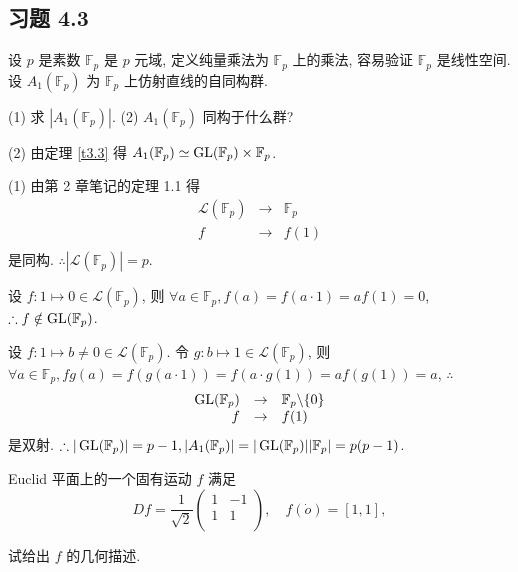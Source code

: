 \documentclass{ctexart}
\begin{document}
\subsection{习题 4.3}
    
\begin{exercise}%
    设 $p$ 是素数 $\mathbb{F}_p$ 是 $p$ 元域, 定义纯量乘法为 $\mathbb{F}_p$ 上的乘法, 容易验证 $\mathbb{F}_p$ 是线性空间. 设 $A_1(\mathbb{F}_p)$ 为 $\mathbb{F}_p$ 上仿射直线的自同构群.

    (1) 求 $|A_1(\mathbb{F}_p)|$. (2) $A_1(\mathbb{F}_p)$ 同构于什么群?
\end{exercise}
\begin{solution}
    (2) 由定理 \ref{t3.3} 得 $A_1(\mathbb{F}_p)\simeq\operatorname{GL} (\mathbb{F}_p)\times\mathbb{F}_p$.

    (1) 由第 2 章笔记的定理 1.1 得
    \[\begin{array}{rcl}
        \mathcal{L}(\mathbb{F}_p) & \to & \mathbb{F}_p \\
        f & \to & f(1) \\
    \end{array}\]
    是同构. $\therefore|\mathcal{L}(\mathbb{F}_p)|=p$.

    设 $f:1\mapsto0\in\mathcal{L}(\mathbb{F}_p)$, 则 $\forall a\in\mathbb{F}_p,f(a)=f(a\cdot 1)=af(1)=0$, $\therefore f\notin\operatorname{GL} (\mathbb{F}_p)$.

    设 $f:1\mapsto b\neq0\in\mathcal{L}(\mathbb{F}_p)$. 令 $g:b\mapsto 1\in\mathcal{L}(\mathbb{F}_p)$, 则 $\forall a\in\mathbb{F}_p,fg(a)=f(g(a\cdot 1))=f(a\cdot g(1))=af(g(1))=a$, $\therefore$
    \[\begin{array}{rcl}
        \operatorname{GL} (\mathbb{F}_p) & \to & \mathbb{F}_p\backslash\{0\} \\
        f & \to & f(1) \\
    \end{array}\]
    是双射. $\therefore|\operatorname{GL} (\mathbb{F}_p)|=p-1,|A_1(\mathbb{F}_p)|=|\operatorname{GL} (\mathbb{F}_p)||\mathbb{F}_p|=p(p-1)$.
\end{solution}
\begin{exercise}%
    Euclid 平面上的一个固有运动 $f$ 满足
    \[Df=\dfrac{1}{\sqrt{2}}\begin{pmatrix}
        1 & -1 \\
        1 & 1 \\
    \end{pmatrix},\quad f(\dot{o})=[1,1],\]

    试给出 $f$ 的几何描述.
\end{exercise}
\end{document}

